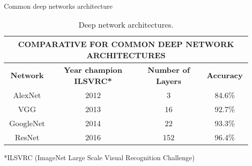 \begin{frame}[t]{Common deep networks architecture}
    \vspace{0.5cm}
    \begin{table}[]
        \begin{tabular}{|c|c|c|c|}
        \hline
        \multicolumn{4}{|c|}{\textbf{COMPARATIVE FOR COMMON DEEP NETWORK ARCHITECTURES}}                 \\ \hline
        \textbf{Network} & \textbf{Year champion ILSVRC*} & \textbf{Number of Layers} & \textbf{Accuracy} \\ \hline
        AlexNet          & 2012                          & 3                         & 84.6\%            \\ \hline
        VGG              & 2013                          & 16                        & 92.7\%            \\ \hline
        GoogleNet        & 2014                          & 22                        & 93.3\%            \\ \hline
        ResNet           & 2016                          & 152                       & 96.4\%            \\ \hline
        \end{tabular}
        \caption{Deep network architectures. \cite{garcia2018survey}}
        \label{tab:deep-net}
        \end{table}

    *ILSVRC (ImageNet Large Scale Visual Recognition Challenge)
   
\end{frame}
